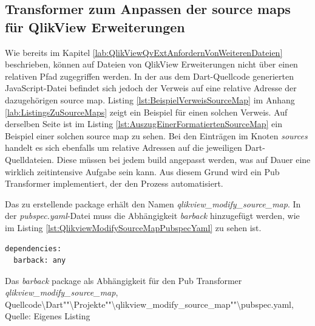 

\subsection{Transformer zum Anpassen der source maps für QlikView Erweiterungen}
\label{lab:TransformerZumAnpassenDerSourceMapsFürQlikViewErweiterungen} 

Wie bereits im Kapitel \ref{lab:QlikViewQvExtAnfordernVonWeiterenDateien} beschrieben, können auf Dateien von QlikView Erweiterungen nicht über einen relativen Pfad zugegriffen werden. In der aus dem Dart-Quellcode generierten JavaScript-Datei befindet sich jedoch der Verweis auf eine relative Adresse der dazugehörigen source map. Listing \ref{lst:BeispielVerweisSourceMap} im Anhang \ref{lab:ListingsZuSourceMaps} zeigt ein Beispiel für einen solchen Verweis. Auf derselben Seite ist im Listing \ref{lst:AuszugEinerFormatiertenSourceMap} ein Beispiel einer solchen source map zu sehen. Bei den Einträgen im Knoten \textit{sources} handelt es sich ebenfalls um relative Adressen auf die jeweiligen Dart-Quelldateien. Diese müssen bei jedem build angepasst werden, was auf Dauer eine wirklich zeitintensive Aufgabe sein kann. Aus diesem Grund wird ein Pub Transformer implementiert, der den Prozess automatisiert.

Das zu erstellende package erhält den Namen \textit{qlikview\_modify\_source\_map}. In der \textit{pubspec.yaml}-Datei muss die Abhängig\-keit \textit{barback} hinzugefügt werden, wie im Listing \ref{lst:QlikviewModifySourceMapPubspecYaml} zu sehen ist.

\ifIncludeFigures\begin{listing}[htbp]
\begin{verbatim}
dependencies:
  barback: any
\end{verbatim}
\caption[Das \textit{barback} package als Abhängig\-keit für den Pub Transformer]{Das \textit{barback} package als Abhängig\-keit für den Pub Transformer \textit{qlikview\_modify\_source\_map}, Quellcode\textbackslash{}Dart""\textbackslash{}Projekte""\textbackslash{}qlikview\_modify\_source\_map""\textbackslash{}pubspec.yaml, Quelle: Eigenes Listing}
\label{lst:QlikviewModifySourceMapPubspecYaml}
\end{listing}\fi


